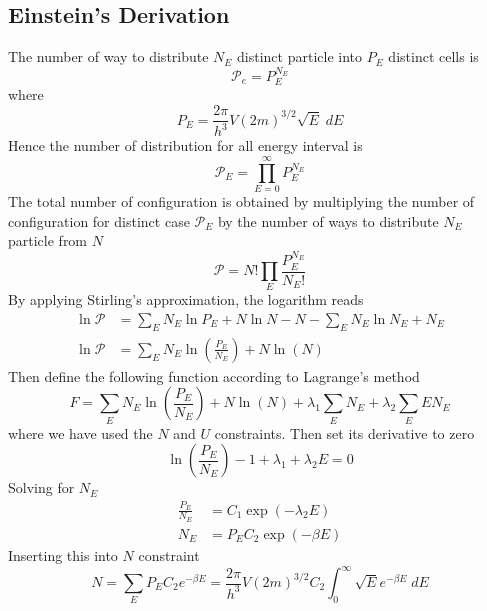 \documentclass[../../../Main.tex]{subfiles}
\begin{document}
\subsection*{Einstein's Derivation}
The number of way to distribute $N_E$ distinct particle into $P_E$ distinct cells is 
\begin{equation*}
    \mathcal{P}_e=P_E^{N_E}
\end{equation*}
where
\begin{equation*}
    P_E=\frac{2\pi}{h^3}V(2m)^{3/2}\sqrt{E}\;dE
\end{equation*}
Hence the number of distribution for all energy interval is 
\begin{equation*}
    \mathcal{P}_E=\prod_{E=0}^{\infty}P_E^{N_E}
\end{equation*}
The total number of configuration is obtained by multiplying the number of configuration for distinct case $\mathcal{P}_E$ by the number of ways to distribute $N_E$ particle from $N$
\begin{equation*}
    \mathcal{P}=N! \prod_{E} \frac{P_E^{N_E}}{N_E!}
\end{equation*}
By applying Stirling's approximation, the logarithm reads
\begin{align*}
    \ln \mathcal{P}&=\sum_E N_E \ln P_E+ N\ln N -N-\sum_E N_E \ln N_E+ N_E\\
    \ln \mathcal{P}&=\sum_E N_E \ln \left(\frac{P_E}{N_E}\right)+ N\ln (N)
\end{align*} 
Then define the following function according to Lagrange's method
\begin{equation*}
    F=\sum_E N_E \ln \left(\frac{P_E}{N_E}\right)+ N\ln (N) +\lambda_1\sum_E N_E +\lambda_2\sum_E EN_E
\end{equation*}
where we have used the $N$ and $U$ constraints. Then set its derivative to zero 
\begin{equation*}
    \ln \left(\frac{P_E}{N_E}\right)-1+\lambda_1+\lambda_2E=0
\end{equation*}
Solving for $N_E$
\begin{align*}
    \frac{P_E }{N_E}&=C_1\exp\left(-\lambda_2E\right)\\
    N_E&=P_E C_2 \exp\left(-\beta E\right)
\end{align*}
Inserting this into $N$ constraint
\begin{equation*}
    N=\sum_E P_E C_2 e^{-\beta E}= \frac{2\pi}{h^3}V(2m)^{3/2} C_2\int_{0}^{\infty} \sqrt{E}e^{-\beta E}\;dE
\end{equation*}
\end{document}
